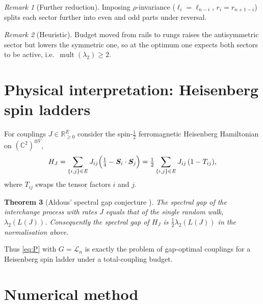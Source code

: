 \documentclass[11pt,a4paper]{article}
\newif\ifdraftnotes
\newcommand{\todo}[1]{\ifdraftnotes{\color{red!70!black}\sffamily[TODO: #1]}\fi}
\theoremstyle{plain}
\newtheorem{theorem}{Theorem}[section]
\theoremstyle{definition}
\theoremstyle{remark}
\newtheorem{remark}[theorem]{Remark}
\newcommand{\R}{\mathbb{R}}
\newcommand{\Lad}{\mathcal{L}}            %
\DeclareMathOperator{\mult}{mult}
\begin{document}
	\begin{remark}[Further reduction]
		Imposing $\rho$-invariance ($\ell_i=\ell_{n-i}$, $r_i=r_{n+1-i}$) splits
		each sector further into even and odd parts under reversal.
		\todo{Work out; decide whether worth implementing.}
	\end{remark}
	
	\begin{remark}[Heuristic]
		Budget moved from rails to rungs raises the antisymmetric sector but lowers
		the symmetric one, so at the optimum one expects both sectors to be active,
		i.e.\ $\mult(\lambda_2)\ge2$. \todo{Prove or check numerically.}
	\end{remark}
	
	\section{Physical interpretation: Heisenberg spin ladders}\label{sec:physics}
	
	For couplings $J\in\R^E_{\ge0}$ consider the spin-$\tfrac12$ ferromagnetic
	Heisenberg Hamiltonian on $(\mathbb C^2)^{\otimes V}$,
	\[
	H_J=\sum_{\{i,j\}\in E}J_{ij}\Bigl(\tfrac14-\bm S_i\cdot\bm S_j\Bigr)
	=\tfrac12\sum_{\{i,j\}\in E}J_{ij}\,(1-T_{ij}),
	\]
	where $T_{ij}$ swaps the tensor factors $i$ and $j$.
	
	\begin{theorem}[Aldous' spectral gap conjecture \cite{CaputoLiggettRichthammer2010}]
		The spectral gap of the interchange process with rates $J$ equals that of
		the single random walk, $\lambda_2(L(J))$. Consequently the spectral gap
		of $H_J$ is $\tfrac12\lambda_2(L(J))$ in the normalisation above.
	\end{theorem}
	
	\todo{Align normalisation with the thesis preprint; explain the
		representation-theoretic step (the gap is attained in the standard
		representation, which occurs in $(\mathbb C^2)^{\otimes N}$).} Thus
	\eqref{eq:P} with $G=\Lad_n$ is exactly the problem of gap-optimal
	couplings for a Heisenberg spin ladder under a total-coupling budget.
	
	\section{Numerical method}\label{sec:numerics}
	
\end{document}
